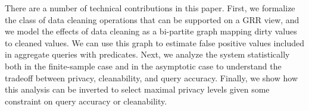 There are a number of technical contributions in this paper.
First, we formalize the class of data cleaning operations that can be supported on a GRR view, and we model the effects of data cleaning as a bi-partite graph mapping dirty values to cleaned values.
We can use this graph to estimate false positive values included in aggregate queries with predicates. 
Next, we analyze the system statistically both in the finite-sample case and in the asymptotic case to understand the tradeoff between privacy, cleanability, and query accuracy.
Finally, we show how this analysis can be inverted to select maximal privacy levels given some constraint on query accuracy or cleanability.















